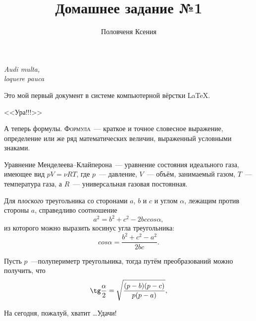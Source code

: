 \documentclass[12pt]{article}
\title{Домашнее задание №1}
\author{Половченя Ксения}
\date{}
\begin{document}
	\maketitle
	\begin{flushright}
		{\itshape Audi multa,\\ loquere pauca}
	\end{flushright}
	\vspace{20pt}
	Это мой первый документ в системе компьютерной вёрстки \LaTeX.
	\vspace{20pt}
	\begin{center}
		{\LARGE \sffamily <<Ура!!!>>}
	\end{center}
	\vspace{15pt}
	
	А теперь формулы. {\scshape Формула}~--- краткое и точное словесное выражение, определение или же ряд математических величин, выраженный условными знаками.
	\vspace{15pt}
	
	\hspace{28pt}{\Large \bfseries Термодинамика}
	
	Уравнение Менделеева--Клайперона~--- уравнение состояния идеального газа, имеющее вид $pV = \nu RT$, где $p$~--- давление,  $V$~--- объём, занимаемый газом, $T$~--- температура газа, а $R$~--- универсальная газовая постоянная.
	\vspace{15pt}
	
	\hspace{28pt}{\Large \bfseries Геометрия \hfill Планиметрия}
	
	Для {\slshape плоского} треугольника со сторонами $a$, $b$ и $c$ и углом $\alpha$, лежащим против стороны $a$, справедливо соотношение $$a^2 = b^2 + c^2 - 2bccos\alpha,$$ из которого можно выразить косинус угла треугольника: $$cos\alpha = \frac{b^2+c^2-a^2}{2bc}.$$
	\par
	Пусть $p$~---полупериметр треугольника, тогда путём преобразований можно получить, что $$\tg\frac{\alpha}{2} = \sqrt{\frac{(p - b)(p - c)}{p(p - a)}},$$
	
	\vspace{1cm}
	\begin{flushleft}
		На сегодня, пожалуй, хватит \ldots Удачи!
	\end{flushleft}
	
\end{document}
